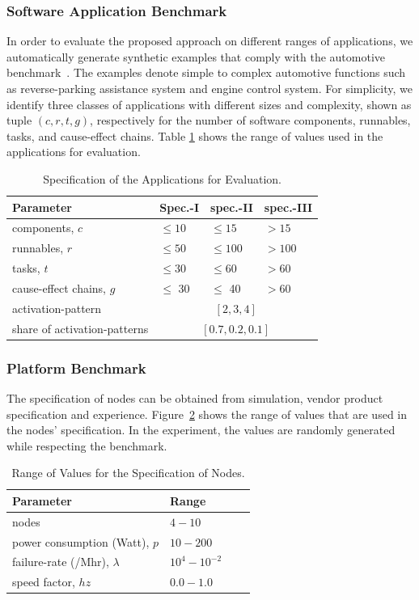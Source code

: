 \subsubsection{Software Application Benchmark} In order to evaluate the proposed approach on different ranges of applications, we automatically generate synthetic examples that comply with the automotive benchmark~\cite{Kramer2015RealFree}. The examples denote simple to complex automotive functions such as reverse-parking assistance system and engine control system. For simplicity, we identify three classes of applications with different sizes and complexity, shown as tuple $(c, r, t, g)$, respectively for the number of software components, runnables, tasks, and cause-effect chains. Table \ref{tbl_appsspec} shows the range of values used in the applications for evaluation. 
\begin{table}[h]
\centering\small
\begin{tabular}{@{}llll@{}}
\toprule
Parameter  		& Spec.-I  & spec.-II & spec.-III\\ 
\midrule
components, $c$		& $\leq 10$	& $\leq 15$ 	& $> 15$\\ 
runnables, $r$		& $\leq 50$	& $\leq 100$ 	& $> 100$\\
tasks, $t$ 			& $\leq 30$ & $\leq 60$ 	& $> 60$\\
cause-effect chains, $g$ & $\leq$ 30 & $\leq$ 40 & $> 60$\\ \midrule
activation-pattern	& \multicolumn{3}{c}{$[2,3,4]$}\\ \midrule
share of activation-patterns	& \multicolumn{3}{c}{$[0.7, 0.2, 0.1]$}\\
\bottomrule
\end{tabular}
\caption{Specification of the Applications for Evaluation.}
\label{tbl_appsspec}
\end{table}

\subsubsection{Platform Benchmark} The specification of nodes can be obtained from simulation, vendor product specification and  experience. Figure~\ref{tbl_nodesspecs} shows the range of values that are used in the nodes' specification. In the experiment, the values are randomly generated while respecting the benchmark.
\begin{table}[h]
\centering\small
\begin{tabular}{@{}llll@{}}
\toprule
Parameter  		& Range\\ 
\midrule
nodes							& $4-10$\\
power consumption (Watt), $p$ 	& $10 - 200$\\
failure-rate (/Mhr), $\lambda$ 	& $10^4 - 10^{-2}$\\
speed factor, $hz$			 	& $0.0 - 1.0$\\
\bottomrule
\end{tabular}
\caption{Range of Values for the Specification of Nodes.}
\label{tbl_nodesspecs}
\end{table}

